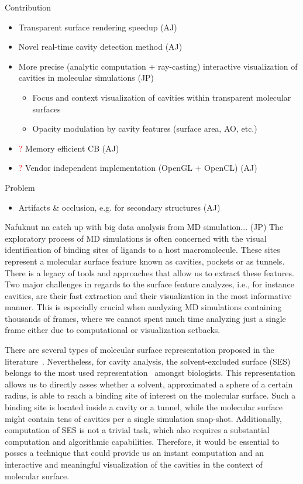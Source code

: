 Contribution
\begin{itemize}
  \item Transparent surface rendering speedup (AJ)
	\item Novel real-time cavity detection method (AJ)
	\item More precise (analytic computation + ray-casting) interactive visualization of cavities in molecular simulations (JP)
	\begin{itemize}
		\item Focus and context visualization of cavities within transparent molecular surfaces
		\item Opacity modulation by cavity features (surface area, AO, etc.)
	\end{itemize}
	\item \textcolor{red}{?} Memory efficient CB (AJ)
	\item \textcolor{red}{?} Vendor independent implementation (OpenGL + OpenCL) (AJ)
\end{itemize}

Problem
\begin{itemize}
  \item Artifacts \& occlusion, e.g. for secondary structures (AJ)
\end{itemize}

Nafuknut na catch up with big data analysis from MD simulation... (JP)
The exploratory process of MD simulations is often concerned with the visual identification of binding sites of ligands to a host macromolecule.
These sites represent a molecular surface feature known as cavities, pockets or as tunnels.
There is a legacy of tools and approaches that allow us to extract these features.
Two major challenges in regards to the surface feature analyzes, i.e., for instance cavities, are their fast extraction and their visualization in the most informative manner. This is especially crucial when analyzing MD simulations containing thousands of frames, where we cannot spent much time analyzing just a single frame either due to computational or visualization setbacks. 

There are several types of molecular surface representation proposed in the literature~\cite{START2015}. Nevertheless, for cavity analysis,  the solvent-excluded surface (SES) belongs to the most used representation~\cite{todo} amongst biologists. This representation allows us to directly asses whether a solvent, approximated a sphere of a certain radius, is able to reach a binding site of interest on the molecular surface. Such a binding site is located inside a cavity or a tunnel, while the molecular surface might contain tens of cavities per a single simulation snap-shot. Additionally, computation of SES is not a trivial task, which also requires a substantial computation and algorithmic capabilities. Therefore, it would be essential to posses a technique that could provide us an instant computation and an interactive and meaningful visualization of the cavities in the context of molecular surface.

